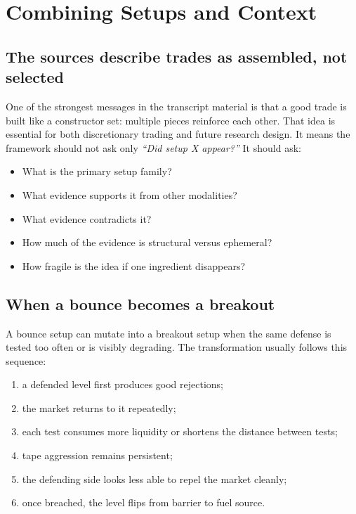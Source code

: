 \section{Combining Setups and Context}

\subsection{The sources describe trades as assembled, not selected}

One of the strongest messages in the transcript material is that a good trade is built like a constructor set: multiple pieces reinforce each other. That idea is essential for both discretionary trading and future research design. It means the framework should not ask only \emph{``Did setup X appear?''} It should ask:

\begin{itemize}[leftmargin=1.5em]
\item What is the primary setup family?
\item What evidence supports it from other modalities?
\item What evidence contradicts it?
\item How much of the evidence is structural versus ephemeral?
\item How fragile is the idea if one ingredient disappears?
\end{itemize}

\subsection{When a bounce becomes a breakout}

A bounce setup can mutate into a breakout setup when the same defense is tested too often or is visibly degrading. The transformation usually follows this sequence:

\begin{enumerate}[leftmargin=1.5em]
\item a defended level first produces good rejections;
\item the market returns to it repeatedly;
\item each test consumes more liquidity or shortens the distance between tests;
\item tape aggression remains persistent;
\item the defending side looks less able to repel the market cleanly;
\item once breached, the level flips from barrier to fuel source.
\end{enumerate}

